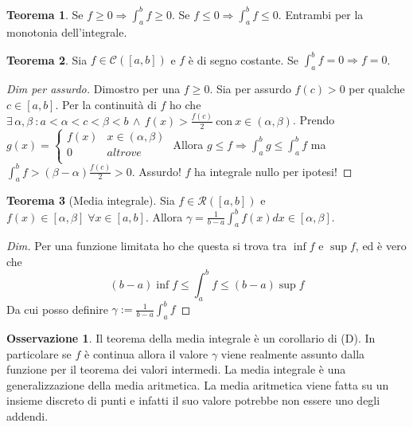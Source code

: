 \documentclass{article}
\theoremstyle{definition}
\newtheorem{theorem}{Teorema}[section]
\theoremstyle{definition}
\theoremstyle{definition}
\theoremstyle{definition}
\newtheorem{remark}{Osservazione}[section]
\theoremstyle{definition}
\begin{document}
\begin{theorem}
    Se $f\geq 0 \Rightarrow \int_{a}^{b}f \geq 0$. \; Se $f\leq 0 \Rightarrow \int_{a}^{b}f \leq 0$. Entrambi per la monotonia dell'integrale.
\end{theorem}

\begin{theorem}
    Sia $f\in\mathcal{C}([a,b])$ e $f$ è di segno costante. Se $\int_{a}^{b}f=0 \Rightarrow f=0$.
    \begin{proof}[Dim per assurdo]
        Dimostro per una $f\geq 0$. Sia per assurdo $f(c)>0$ per qualche $c\in[a,b]$. Per la continuità di $f$ ho che $\exists \, \alpha,\beta \: : a<\alpha<c<\beta<b \,\wedge\, f(x) > \frac{f(c)}{2} \:\text{con}\: x\in(\alpha,\beta)$.
        Prendo $g(x)= \begin{cases}
            f(x) & x\in(\alpha,\beta) \\
            0 & altrove \\
        \end{cases}$
        Allora $g \leq f \Rightarrow \int_a^b g \leq \int_a^b f$ ma $\int_a^b f > (\beta-\alpha)\frac{f(c)}{2}>0$. Assurdo! $f$ ha integrale nullo per ipotesi!
    \end{proof}
\end{theorem}

\begin{theorem}[Media integrale]
    Sia $f\in\mathcal{R}([a,b])$ e $f(x)\in[\alpha,\beta] \; \forall x\in[a,b]$. Allora $\gamma=\frac{1}{b-a}\int_a^bf(x)dx\in[\alpha,\beta]$.
    \begin{proof}[Dim]
        Per una funzione limitata ho che questa si trova tra $\inf f$ e $\sup f$, ed è vero che 
        \[
            (b-a)\inf f \leq \int_a^b f\leq (b-a)\sup f 
        \]
        Da cui posso definire $\gamma := \frac{1}{b-a}\int_a^b f$
    \end{proof}
\end{theorem}

\begin{remark}
    Il teorema della media integrale è un corollario di (D). In particolare se $f$ è continua allora il valore $\gamma$ viene realmente assunto dalla funzione per il teorema dei valori intermedi. La media integrale è una generalizzazione della media aritmetica. La media aritmetica viene fatta su un insieme discreto di punti e infatti il suo valore potrebbe non essere uno degli addendi.
\end{remark}

\vspace{3mm}
\end{document}

